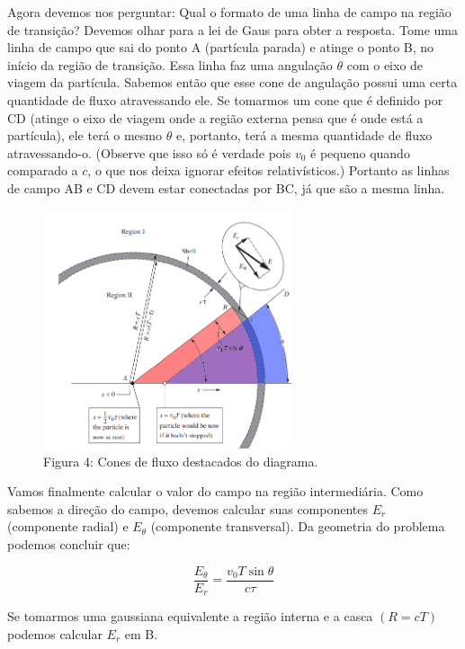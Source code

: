 \documentclass[12pt, letterpaper]{article}
\begin{document}
    Agora devemos nos perguntar: Qual o formato de uma linha de campo na região de transição? Devemos olhar para a lei de Gaus para obter a resposta. Tome uma linha de campo que sai do ponto A (partícula parada) e atinge o ponto B, no início da região de transição. Essa linha faz uma angulação $\theta$ com o eixo de viagem da partícula. Sabemos então que esse cone de angulação possui uma certa quantidade de fluxo atravessando ele. Se tomarmos um cone que é definido por CD (atinge o eixo de viagem onde a região externa pensa que é onde está a partícula), ele terá o mesmo $\theta$ e, portanto, terá a mesma quantidade de fluxo atravessando-o. (Observe que isso só é verdade pois $v_0$ é pequeno quando comparado a $c$, o que nos deixa ignorar efeitos relativísticos.) Portanto as linhas de campo AB e CD devem estar conectadas por BC, já que são a mesma linha.

    \begin{figure}[H]
        \centering
        \includegraphics[width=0.65\textwidth]{highlight}
        \\{Figura 4: Cones de fluxo destacados do diagrama.}
        \label{fig:fig4}
    \end{figure}

    Vamos finalmente calcular o valor do campo na região intermediária. Como sabemos a direção do campo, devemos calcular suas componentes $E_r$ (componente radial) e $E_\theta$ (componente transversal). Da geometria do problema podemos concluir que:
    
    \begin{equation} \label{eq1}
    \frac{E_\theta}{E_r} = \frac{v_0 T\sin{\theta}}{c\tau}
    \end{equation}

    Se tomarmos uma gaussiana equivalente a região interna e a casca $(R = cT)$ podemos calcular $E_r$ em B.
\end{document}
